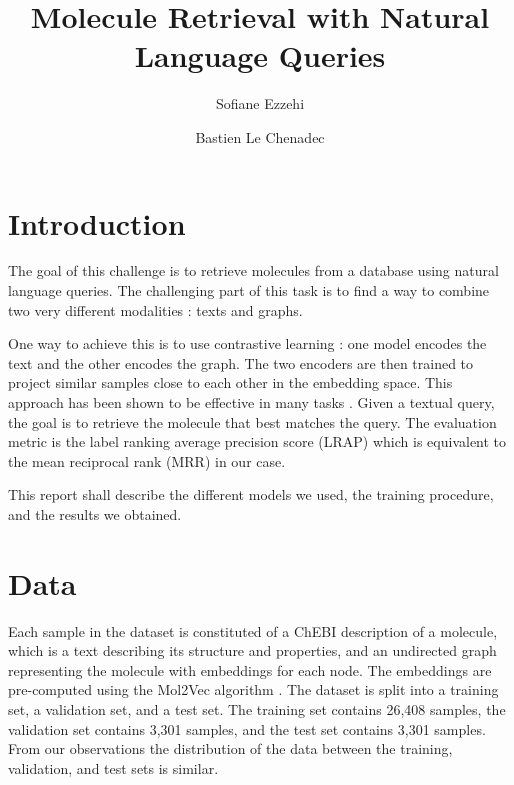\documentclass[switch, 12pt]{article}
\title{Molecule Retrieval with Natural Language Queries}
\author[1]{Sofiane Ezzehi}
\author[1]{Bastien Le Chenadec}
\affil[1]{École des Ponts ParisTech}
\begin{document}
\maketitle

\begin{contribstatement}

\end{contribstatement}
\vspace{0.35cm}

\begin{multicols}{2}
    \section{Introduction}

    The goal of this challenge is to retrieve molecules from a database using natural language queries. The challenging part of this task is to find a way to combine two very different modalities : texts and graphs.

    One way to achieve this is to use contrastive learning : one model encodes the text and the other encodes the graph. The two encoders are then trained to project similar samples close to each other in the embedding space. This approach has been shown to be effective in many tasks \cite{chen-2020,gao-2021}. Given a textual query, the goal is to retrieve the molecule that best matches the query. The evaluation metric is the label ranking average precision score (LRAP) which is equivalent to the mean reciprocal rank (MRR) in our case.

    This report shall describe the different models we used, the training procedure, and the results we obtained.

    \section{Data}

    Each sample in the dataset is constituted of a ChEBI description of a molecule, which is a text describing its structure and properties, and an undirected graph representing the molecule with embeddings for each node. The embeddings are pre-computed using the Mol2Vec algorithm \cite{mol2vec}. The dataset is split into a training set, a validation set, and a test set. The training set contains 26,408 samples, the validation set contains 3,301 samples, and the test set contains 3,301 samples. From our observations the distribution of the data between the training, validation, and test sets is similar.


\end{multicols}
\end{document}
